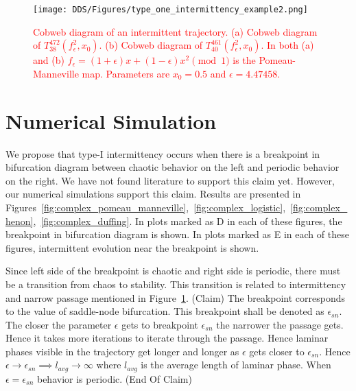 \begin{figure}[!h]
    \centering
    \texttt{[image: DDS/Figures/type\_one\_intermittency\_example2.png]}
    \caption{
        \textcolor{red}{
        Cobweb diagram of an intermittent trajectory. 
        (a) Cobweb diagram of $T^{472}_{38}(f_{\epsilon}^{2}, x_0)$. 
        (b) Cobweb diagram of $T^{461}_{40}(f_{\epsilon}^{2}, x_0)$. 
        In both (a) and (b) $f_{\epsilon} = (1+\epsilon)x+(1-\epsilon)x^2 \pmod{1}$ is the Pomeau-Manneville map. 
        Parameters are $x_0 = 0.5$ and $\epsilon = 4.47458$.
        }
    }
    \label{fig:intermittent_cobweb_example}
\end{figure}

\section{Numerical Simulation}
We propose that type-I intermittency occurs when there is a breakpoint in bifurcation diagram between chaotic behavior on the left and periodic behavior on the right.
We have not found literature to support this claim yet.
However, our numerical simulations support this claim.
Results are presented in Figures~\ref{fig:complex_pomeau_manneville},~\ref{fig:complex_logistic},~\ref{fig:complex_henon},~\ref{fig:complex_duffing}.
In plots marked as D in each of these figures, the breakpoint in bifurcation diagram is shown.
In plots marked as E in each of these figures, intermittent evolution near the breakpoint is shown.
\par
Since left side of the breakpoint is chaotic and right side is periodic, there must be a transition from chaos to stability.
This transition is related to intermittency and narrow passage mentioned in Figure~\ref{fig:intermittent_cobweb_example}.
(Claim) The breakpoint corresponds to the value of saddle-node bifurcation.
This breakpoint shall be denoted as $\epsilon_{sn}$.
The closer the parameter $\epsilon$ gets to breakpoint $\epsilon_{sn}$ the narrower the passage gets.
Hence it takes more iterations to iterate through the passage.
Hence laminar phases visible in the trajectory get longer and longer as $\epsilon$ gets closer to $\epsilon_{sn}$.
Hence $\epsilon \rightarrow \epsilon_{sn} \implies l_{avg} \rightarrow \infty$ where $l_{avg}$ is the average length of laminar phase.
When $\epsilon = \epsilon_{sn}$ behavior is periodic.
(End Of Claim)

